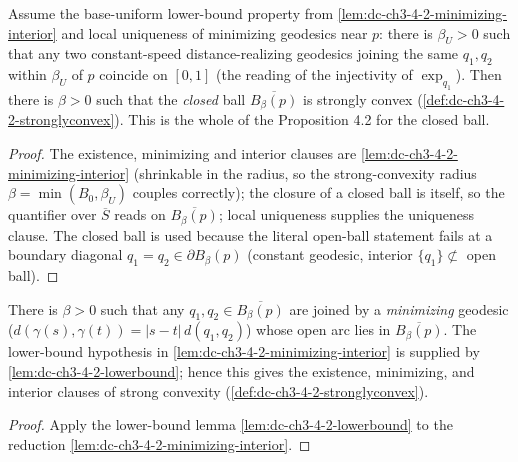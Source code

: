 \begin{lemma}
  \label{lem:dc-ch3-4-2-stronglyconvex-reduction}
  \leanok
  Assume the base-uniform lower-bound property from
  \cref{lem:dc-ch3-4-2-minimizing-interior} and local uniqueness of minimizing
  geodesics near $p$: there is $\beta_U>0$ such that
  any two constant-speed distance-realizing geodesics joining the same $q_1,q_2$ within $\beta_U$ of
  $p$ coincide on $[0,1]$ (the reading of the injectivity of $\exp_{q_1}$). Then there is
  $\beta>0$ such that the \emph{closed} ball $\overline{B_\beta(p)}$ is strongly convex
  (\cref{def:dc-ch3-4-2-stronglyconvex}). This is the whole of the Proposition 4.2 for the
  closed ball.
\end{lemma}
\begin{proof}
  \sketch
  \leanok
  The existence, minimizing and interior clauses are \cref{lem:dc-ch3-4-2-minimizing-interior}
  (shrinkable in the radius, so the strong-convexity radius $\beta=\min(B_0,\beta_U)$ couples
  correctly); the closure of a closed ball is itself, so the quantifier over $\overline{S}$ reads on
  $\overline{B_\beta(p)}$; local uniqueness supplies the uniqueness clause. The closed ball is used
  because the literal open-ball statement fails at a boundary diagonal $q_1=q_2\in\partial B_\beta(p)$
  (constant geodesic, interior $\{q_1\}\not\subset$ open ball).
\end{proof}

\begin{lemma}
  \label{lem:dc-ch3-4-2-minimizing-interior-uncond}
  \leanok
  There is $\beta>0$ such that any $q_1,q_2\in\overline{B_\beta(p)}$ are joined by a \emph{minimizing}
  geodesic ($d(\gamma(s),\gamma(t))=|s-t|\,d(q_1,q_2)$) whose open arc lies in $\overline{B_\beta(p)}$.
  The lower-bound hypothesis in \cref{lem:dc-ch3-4-2-minimizing-interior} is supplied by
  \cref{lem:dc-ch3-4-2-lowerbound}; hence this gives the existence, minimizing, and interior
  clauses of strong convexity (\cref{def:dc-ch3-4-2-stronglyconvex}).
\end{lemma}
\begin{proof}
  \sketch
  \leanok
  Apply the lower-bound lemma \cref{lem:dc-ch3-4-2-lowerbound} to the reduction
  \cref{lem:dc-ch3-4-2-minimizing-interior}.
\end{proof}

